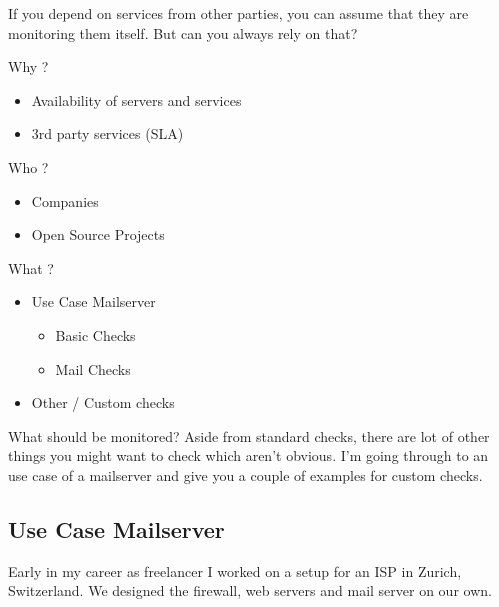 If you depend on services from other parties, you can assume that
they are monitoring them itself. But can you always rely on that?

\begin{frame}[fragile]{Why ?}
\begin{itemize}
\item Availability of servers and services
\item 3rd party services (SLA)
\end{itemize}
\end{frame}

\begin{frame}[fragile]{Who ?}
\begin{itemize}
\item Companies
\item Open Source Projects
\end{itemize}
\end{frame}

\begin{frame}[fragile]{What ?}
\begin{itemize}
\item Use Case Mailserver
\begin{itemize}
\item Basic Checks
\item Mail Checks
\end{itemize}
\item Other / Custom checks
\end{itemize}
\end{frame}


What should be monitored? Aside from standard checks, there are 
lot of other things you might want to check which aren't obvious.
I'm going through to an use case of a mailserver and give you
a couple of examples for custom checks.

\subsection{Use Case Mailserver}
Early in my career as freelancer I worked on a setup for an ISP
in Zurich, Switzerland. We designed the firewall, web servers
and mail server on our own. 

